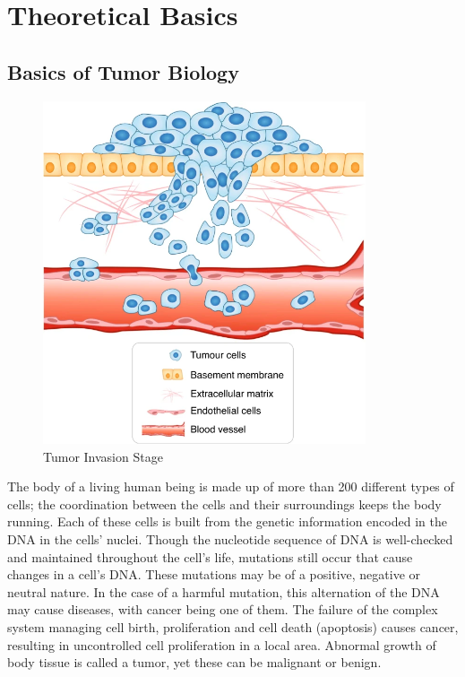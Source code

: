 \section{Theoretical Basics}
\label{sec:theoretical_basics}
\subsection{Basics of Tumor Biology}
\begin{figure}[h]
    \centering
    \includegraphics[width=0.85\textwidth]{resources/images/tumour_invasion_stage.png}
    \caption{Tumor Invasion Stage~\cite{Novikov2021}}
    \label{fig:tumor_invasion_stage}
\end{figure}

The body of a living human being is made up of more than 200 different types of cells; the coordination between the cells and their surroundings keeps the body running. Each of these cells is built from the genetic information encoded in the DNA in the cells' nuclei. Though the nucleotide sequence of DNA is well-checked and maintained throughout the cell's life, mutations still occur that cause changes in a cell's DNA. These mutations may be of a positive, negative or neutral nature. In the case of a harmful mutation, this alternation of the DNA may cause diseases, with cancer being one of them. The failure of the complex system managing cell birth, proliferation and cell death (apoptosis) causes cancer, resulting in uncontrolled cell proliferation in a local area. Abnormal growth of body tissue is called a tumor, yet these can be malignant or benign. 

